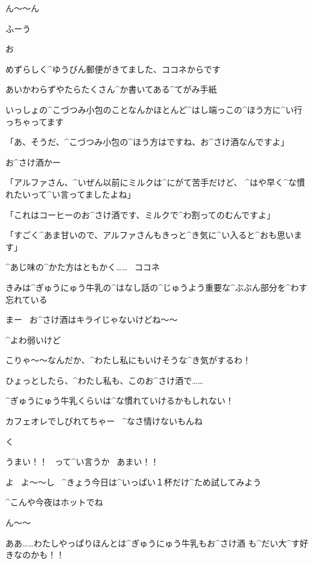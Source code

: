 \page[122]
\Alpha ん〜〜ん

\Alpha ふーう

\page[123]
\Alpha お

\page[124]
\Alpha めずらしく^{ゆうびん}{郵便}がきてました、ココネからです

\Alpha あいかわらずやたらたくさん^{か}{書}いてある^{てがみ}{手紙}

\Alpha いっしょの^{こづつみ}{小包}のことなんかほとんど^{はし}{端}っこの^{ほう}{方}に^{い}{行}っちゃってます

\page[125]
\Kokone 「あ、そうだ、^{こづつみ}{小包}の^{ほう}{方}はですね、お^{さけ}{酒}なんですよ」

\Alpha お^{さけ}{酒}かー

\Kokone 「アルファさん、^{いぜん}{以前}にミルクは^{にがて}{苦手}だけど、
  ^{はや}{早}く^{な}{慣}れたいって^{い}{言}ってましたよね」

\Kokone 「これはコーヒーのお^{さけ}{酒}です、ミルクで^{わ}{割}ってのむんですよ」

\Kokone 「すごく^{あま}{甘}いので、アルファさんもきっと^{き}{気}に^{い}{入}ると^{おも}{思}います」

\Alpha ^{あじ}{味}の^{かた}{方}はともかく……
\ ココネ

\Alpha きみは^{ぎゅうにゅう}{牛乳}の^{はなし}{話}の^{じゅうよう}{重要}な^{ぶぶん}{部分}を^{わす}{忘}れている

\page[126]
\Alpha まー
\ お^{さけ}{酒}はキライじゃないけどね〜〜

\Alpha ^{よわ}{弱}いけど

\page[128]
\Alpha こりゃ〜〜なんだか、^{わたし}{私}にもいけそうな^{き}{気}がするわ！

\Alpha ひょっとしたら、^{わたし}{私}も、このお^{さけ}{酒}で……

\Alpha ^{ぎゅうにゅう}{牛乳}くらいは^{な}{慣}れていけるかもしれない！

\Alpha カフェオレでしびれてちゃー
\ ^{なさ}{情}けないもんね

\page[129]
\Alpha く

\Alpha うまい！！
\ って^{い}{言}うか
\ あまい！！

\Alpha よ
\ よ〜〜し
\ ^{きょう}{今日}は^{いっぱい}{１杯}だけ^{ため}{試}してみよう

\page[130]
\Alpha ^{こんや}{今夜}はホットでね

\page[131]
\Alpha ん〜〜

\Alpha ああ……わたしやっぱりほんとは^{ぎゅうにゅう}{牛乳}もお^{さけ}{酒}
も^{だい}{大}^{す}{好}きなのかも！！

